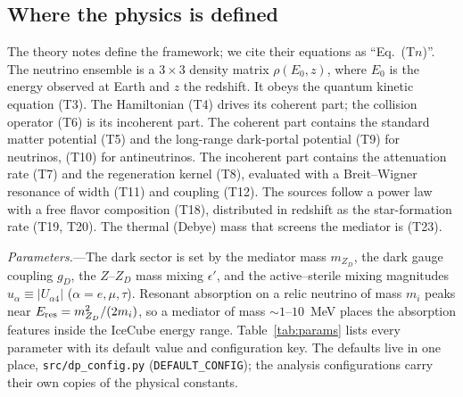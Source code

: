 \documentclass[11pt,a4paper]{article}
\newcommand{\file}[1]{\nolinkurl{#1}}
\newcommand{\mzd}{m_{Z_D}}
\newcommand{\gd}{g_D}
\newcommand{\epsp}{\epsilon'}
\newcommand{\Eres}{E_{\rm res}}
\begin{document}
\subsection{Where the physics is defined}

The theory notes define the framework; we cite their equations as ``Eq.~(T$n$)''. The neutrino
ensemble is a $3\times3$ density matrix $\rho(E_0,z)$, where $E_0$ is the energy observed at
Earth and $z$ the redshift. It obeys the quantum kinetic equation (T3). The Hamiltonian (T4)
drives its coherent part; the collision operator (T6) is its incoherent part. The
coherent part contains the standard matter potential (T5) and the long-range dark-portal
potential (T9) for neutrinos, (T10) for antineutrinos. The incoherent part contains the
attenuation rate (T7) and the regeneration kernel (T8), evaluated with a Breit--Wigner
resonance of width (T11) and coupling (T12). The sources follow a power law with a free flavor
composition (T18), distributed in redshift as the star-formation rate (T19, T20). The thermal
(Debye) mass that screens the mediator is (T23).

\textit{Parameters.}---The dark sector is set by the mediator mass $\mzd$, the dark gauge
coupling $\gd$, the $Z$--$Z_D$ mass mixing $\epsp$, and the active--sterile mixing magnitudes
$u_\alpha \equiv |U_{\alpha 4}|$ ($\alpha = e, \mu, \tau$). Resonant absorption on a relic
neutrino of mass $m_i$ peaks near $\Eres = \mzd^2/(2 m_i)$, so a mediator of mass
$\sim1$--$10$~MeV places the absorption features inside the IceCube energy range. Table~\ref{tab:params}
lists every parameter with its default value and configuration key. The defaults live in one
place, \file{src/dp_config.py} (\texttt{DEFAULT\_CONFIG}); the analysis configurations carry
their own copies of the physical constants.
\end{document}
